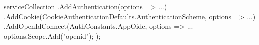 \begin{spverbatim}
    serviceCollection
    .AddAuthentication(options => {...})
    .AddCookie(CookieAuthenticationDefaults.AuthenticationScheme, options => {...})
    .AddOpenIdConnect(AuthConstants.AppOidc, options =>
        {
        ...
        options.Scope.Add("openid");
    });
\end{spverbatim}